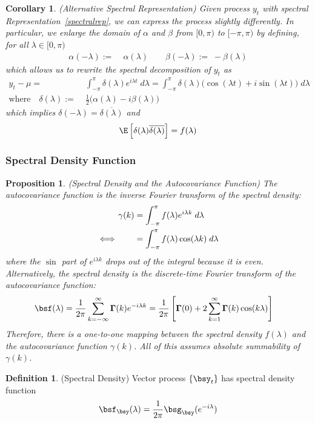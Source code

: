 \documentclass[12pt]{article}
\theoremstyle{plain}
\newtheorem{prop}[thm]{Proposition}
\newtheorem{cor}[thm]{Corollary}
\theoremstyle{definition}
\newtheorem{defn}[thm]{Definition}
\theoremstyle{remark}
\newcommand{\bsGamma}{\boldsymbol{\Gamma}}
\begin{document}
\begin{cor}(\emph{Alternative Spectral Representation})
Given process $y_t$ with spectral Representation~\ref{spectralrep}, we
can express the process slightly differently. In particular, we
enlarge the domain of $\alpha$ and $\beta$ from $[0,\pi)$ to
$[-\pi,\pi)$ by defining, for all $\lambda \in[0,\pi)$
\begin{align*}
  \alpha(-\lambda) :=& \;\alpha(\lambda)
  \qquad
  \beta(-\lambda) := \;-\beta(\lambda)
\end{align*}
which allows us to rewrite the spectral decomposition of $y_t$ as
\begin{align*}
  y_t-\mu =&\; \int_{-\pi}^\pi \delta(\lambda)e^{i\lambda t}\;d\lambda
  =\int_{-\pi}^\pi
  \delta(\lambda)\big(\cos(\lambda t)+i\sin(\lambda t)\big)\;d\lambda
  \\
  \text{where}\quad
  \delta(\lambda) :=& \;
    \frac{1}{2}\big(\alpha(\lambda)-i\beta(\lambda)\big)
\end{align*}
which implies $\delta(-\lambda)=\overline{\delta(\lambda)}$ and
\begin{align*}
\E\left[\delta(\lambda)\overline{\delta(\lambda)}\right] = f(\lambda)
\end{align*}
\end{cor}


\clearpage
\subsubsection{Spectral Density Function}

\begin{prop}\emph{(Spectral Density and the Autocovariance Function)}
The autocovariance function is the inverse Fourier transform of the
spectral density:
\begin{align}
  \gamma(k)
  &= \int_{-\pi}^\pi f(\lambda)e^{i\lambda k}\;d\lambda
  \label{inversefourier}
  \\
  \iff\qquad
  &= \int_{-\pi}^\pi f(\lambda)\cos(\lambda k)\;d\lambda
  \notag
\end{align}
where the $\sin$ part of $e^{i\lambda k}$ drops out of the integral
because it is even. Alternatively, the spectral density is the
discrete-time Fourier transform of the autocovariance function:
\begin{align}
  \bsf(\lambda)
  &= \frac{1}{2\pi} \sum_{k=-\infty}^\infty
  \bsGamma(k) e^{-i\lambda k}
  = \frac{1}{2\pi}
  \left[
    \bsGamma(0) + 2\sum_{k=1}^\infty \bsGamma(k)\cos(k\lambda)
  \right]
  \label{fourier}
\end{align}
Therefore, there is a one-to-one mapping between the spectral density
$f(\lambda)$ and the autocovariance function $\gamma(k)$.
All of this assumes absolute summability of $\gamma(k)$.
\end{prop}
\begin{defn}(Spectral Density)
Vector process $\{\bsy_t\}$ has spectral density function
\begin{align*}
  \bsf_{\bsy}(\lambda) = \frac{1}{2\pi} \bsg_{\bsy}(e^{-i\lambda})
\end{align*}
\end{defn}
\end{document}
